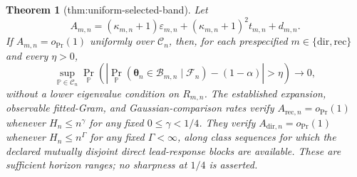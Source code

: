 \documentclass{article}
\newtheorem{theorem}{Theorem}
\begin{document}
\begin{theorem}[thm:uniform-selected-band]\label{thm:uniform-selected-band}
Let
\[
 A_{m,n}=(\kappa_{m,n}+1)\varepsilon_{m,n}
 +(\kappa_{m,n}+1)^2t_{m,n}+d_{m,n}.
\]
If \(A_{m,n}=o_{\Pr}(1)\) uniformly over \(\mathcal C_n\), then, for each prespecified \(m\in\{\mathrm{dir},\mathrm{rec}\}\) and every \(\eta>0\),
\[
 \sup_{\mathbb P\in\mathcal C_n}
 \Pr_{\mathbb P}\!\left(
 \left|\Pr_{\mathbb P}(\boldsymbol\theta_n\in\mathcal B_{m,n}
 \mid\mathcal F_n)-(1-\alpha)\right|>\eta\right)\longrightarrow0,
\]
without a lower eigenvalue condition on \(R_{m,n}\).  The established expansion, observable fitted-Gram, and Gaussian-comparison rates verify \(A_{\mathrm{rec},n}=o_{\Pr}(1)\) whenever \(H_n\le n^\gamma\) for any fixed \(0\le\gamma<1/4\).  They verify \(A_{\mathrm{dir},n}=o_{\Pr}(1)\) whenever \(H_n\le n^\Gamma\) for any fixed \(\Gamma<\infty\), along class sequences for which the declared mutually disjoint direct lead-response blocks are available.  These are sufficient horizon ranges; no sharpness at \(1/4\) is asserted.
\end{theorem}
\end{document}

